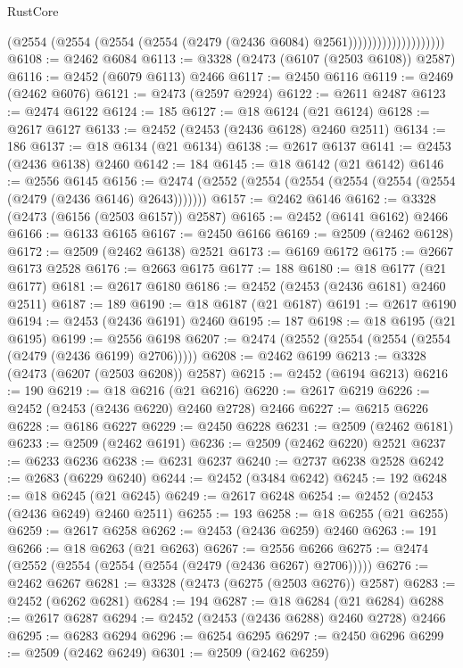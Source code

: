 \begin{lexlean}{RustCore}
\begin{coremodule}
                                  (@2554
                                    (@2554
                                      (@2554 (@2554 (@2479 (@2436 @6084) @2561))))))))))))))))))))
@6108 := @2462 @6084
@6113 := @3328 (@2473 (@6107 (@2503 @6108)) @2587)
@6116 := @2452 (@6079 @6113) @2466
@6117 := @2450 @6116
@6119 := @2469 (@2462 @6076)
@6121 := @2473 (@2597 @2924)
@6122 := @2611 @2487
@6123 := @2474 @6122
@6124 := 185
@6127 := @18 @6124 (@21 @6124)
@6128 := @2617 @6127
@6133 := @2452 (@2453 (@2436 @6128) @2460 @2511)
@6134 := 186
@6137 := @18 @6134 (@21 @6134)
@6138 := @2617 @6137
@6141 := @2453 (@2436 @6138) @2460
@6142 := 184
@6145 := @18 @6142 (@21 @6142)
@6146 := @2556 @6145
@6156 := @2474 (@2552 (@2554 (@2554 (@2554 (@2554 (@2554 (@2479 (@2436 @6146) @2643)))))))
@6157 := @2462 @6146
@6162 := @3328 (@2473 (@6156 (@2503 @6157)) @2587)
@6165 := @2452 (@6141 @6162) @2466
@6166 := @6133 @6165
@6167 := @2450 @6166
@6169 := @2509 (@2462 @6128)
@6172 := @2509 (@2462 @6138) @2521
@6173 := @6169 @6172
@6175 := @2667 @6173 @2528
@6176 := @2663 @6175
@6177 := 188
@6180 := @18 @6177 (@21 @6177)
@6181 := @2617 @6180
@6186 := @2452 (@2453 (@2436 @6181) @2460 @2511)
@6187 := 189
@6190 := @18 @6187 (@21 @6187)
@6191 := @2617 @6190
@6194 := @2453 (@2436 @6191) @2460
@6195 := 187
@6198 := @18 @6195 (@21 @6195)
@6199 := @2556 @6198
@6207 := @2474 (@2552 (@2554 (@2554 (@2554 (@2479 (@2436 @6199) @2706)))))
@6208 := @2462 @6199
@6213 := @3328 (@2473 (@6207 (@2503 @6208)) @2587)
@6215 := @2452 (@6194 @6213)
@6216 := 190
@6219 := @18 @6216 (@21 @6216)
@6220 := @2617 @6219
@6226 := @2452 (@2453 (@2436 @6220) @2460 @2728) @2466
@6227 := @6215 @6226
@6228 := @6186 @6227
@6229 := @2450 @6228
@6231 := @2509 (@2462 @6181)
@6233 := @2509 (@2462 @6191)
@6236 := @2509 (@2462 @6220) @2521
@6237 := @6233 @6236
@6238 := @6231 @6237
@6240 := @2737 @6238 @2528
@6242 := @2683 (@6229 @6240)
@6244 := @2452 (@3484 @6242)
@6245 := 192
@6248 := @18 @6245 (@21 @6245)
@6249 := @2617 @6248
@6254 := @2452 (@2453 (@2436 @6249) @2460 @2511)
@6255 := 193
@6258 := @18 @6255 (@21 @6255)
@6259 := @2617 @6258
@6262 := @2453 (@2436 @6259) @2460
@6263 := 191
@6266 := @18 @6263 (@21 @6263)
@6267 := @2556 @6266
@6275 := @2474 (@2552 (@2554 (@2554 (@2554 (@2479 (@2436 @6267) @2706)))))
@6276 := @2462 @6267
@6281 := @3328 (@2473 (@6275 (@2503 @6276)) @2587)
@6283 := @2452 (@6262 @6281)
@6284 := 194
@6287 := @18 @6284 (@21 @6284)
@6288 := @2617 @6287
@6294 := @2452 (@2453 (@2436 @6288) @2460 @2728) @2466
@6295 := @6283 @6294
@6296 := @6254 @6295
@6297 := @2450 @6296
@6299 := @2509 (@2462 @6249)
@6301 := @2509 (@2462 @6259)

\end{coremodule}
\end{lexlean}
